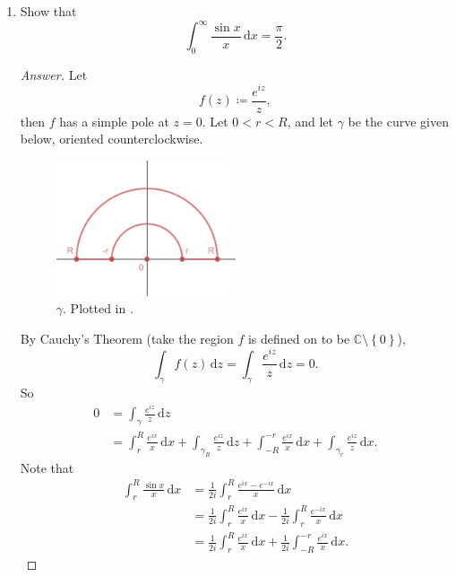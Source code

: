 \documentclass[12pt]{article}
\newcommand{\cx}{\mathbb{C}}
\newcommand\setb[1]{\left \{ #1 \right \}}
\theoremstyle{definition}
\begin{document}
\begin{enumerate}
\begin{proof}[Answer]
\begin{align*}
            & = \frac{\pi}{\sqrt{2}} - 0 == \boxed{ \frac{\pi}{\sqrt{2}}. }
        \end{align*}
    \end{proof}
    \item Show that 
    \[
        \int_0^{\infty} \frac{\sin x}{x} \, \mathrm{d}x = \frac{\pi}{2}.
    \]
    \begin{proof}[Answer]
        Let 
        \[
            f(z) \coloneqq \frac{e^{iz}}{z},
        \]
        then $f$ has a simple pole at $z = 0$. Let $0 < r < R$, and let $\gamma$ be the curve given below, oriented counterclockwise.
        \begin{figure}[H]
            \centering
            \includegraphics[width = 0.5\textwidth]{7}
            \caption{$\gamma$. Plotted in \cite{Desmos}.}
            \label{fig:fig7}
        \end{figure}
        By Cauchy's Theorem (take the region $f$ is defined on to be $\cx \setminus \setb{ 0 }$), 
        \[
            \int_{\gamma} f(z) \, \mathrm{d}z = \int_{\gamma} \frac{e^{iz}}{z} \, \mathrm{d}z = 0.
        \]
        So 
        \begin{align*}
            0 & = \int_{\gamma} \frac{e^{iz}}{z} \, \mathrm{d}z \\
            & = \int_r^R \frac{e^{ix}}{x} \, \mathrm{d}x + \int_{\gamma_R} \frac{e^{iz}}{z} \, \mathrm{d}z + \int_{-R}^{-r} \frac{e^{ix}}{x} \, \mathrm{d}x + \int_{\gamma_r} \frac{e^{iz}}{z} \, \mathrm{d}x.
        \end{align*}
        Note that 
        \begin{align*}
            \int_r^R \frac{ \sin x}{x} \, \mathrm{d}x & = \frac{1}{2i} \int_r^R \frac{e^{ix} - e^{-ix}}{x} \, \mathrm{d}x \\
            & = \frac{1}{2i} \int_r^R \frac{e^{ix}}{x} \, \mathrm{d}x - \frac{1}{2i} \int_r^R \frac{e^{-ix}}{x} \, \mathrm{d}x \\
            & = \frac{1}{2i} \int_r^R \frac{e^{ix}}{x} \, \mathrm{d}x + \frac{1}{2i} \int_{-R}^{-r} \frac{e^{ix}}{x} \, \mathrm{d}x.

\end{align*}
\end{proof}
\end{enumerate}
\end{document}
